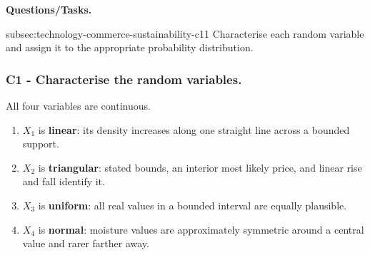 	\textbf{Questions/Tasks.}
	\begin{enumerate}
		\CriterionTask
		{subsec:technology-commerce-sustainability-c1}{1}
		{Characterise each random variable and assign it to the appropriate probability distribution.}
	\end{enumerate}

	\subsubsection*{C1 - Characterise the random variables.}
	\phantomsection
	\label{subsec:technology-commerce-sustainability-c1}

	All four variables are continuous.
	\begin{enumerate}
		\item $X_1$ is \textbf{linear}: its density increases along one straight line across a bounded support.
		\item $X_2$ is \textbf{triangular}: stated bounds, an interior most likely price, and linear rise and fall identify it.
		\item $X_3$ is \textbf{uniform}: all real values in a bounded interval are equally plausible.
		\item $X_4$ is \textbf{normal}: moisture values are approximately symmetric around a central value and rarer farther away.
	\end{enumerate}




